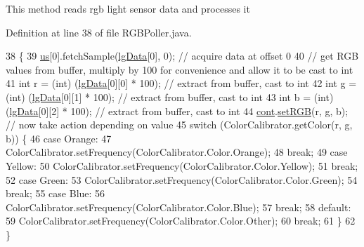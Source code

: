 This method reads rgb light sensor data and processes it 

Definition at line 38 of file R\+G\+B\+Poller.\+java.


\begin{DoxyCode}
38                              \{
39     \hyperlink{classca_1_1mcgill_1_1ecse211_1_1threads_1_1_light_poller_ab6a9cb770bbf71f586697633db1475ff}{us}[0].fetchSample(\hyperlink{classca_1_1mcgill_1_1ecse211_1_1threads_1_1_light_poller_a6cf53aecc3efc481f71d36341d2276c6}{lgData}[0], 0); \textcolor{comment}{// acquire data at offset 0}
40     \textcolor{comment}{// get RGB values from buffer, multiply by 100 for convenience and allow it to be cast to int}
41     \textcolor{keywordtype}{int} r = (int) (\hyperlink{classca_1_1mcgill_1_1ecse211_1_1threads_1_1_light_poller_a6cf53aecc3efc481f71d36341d2276c6}{lgData}[0][0] * 100); \textcolor{comment}{// extract from buffer, cast to int}
42     \textcolor{keywordtype}{int} g = (int) (\hyperlink{classca_1_1mcgill_1_1ecse211_1_1threads_1_1_light_poller_a6cf53aecc3efc481f71d36341d2276c6}{lgData}[0][1] * 100); \textcolor{comment}{// extract from buffer, cast to int}
43     \textcolor{keywordtype}{int} b = (int) (\hyperlink{classca_1_1mcgill_1_1ecse211_1_1threads_1_1_light_poller_a6cf53aecc3efc481f71d36341d2276c6}{lgData}[0][2] * 100); \textcolor{comment}{// extract from buffer, cast to int}
44     \hyperlink{classca_1_1mcgill_1_1ecse211_1_1threads_1_1_light_poller_ab6a9050ced4f6940add4735c8872194a}{cont}.\hyperlink{classca_1_1mcgill_1_1ecse211_1_1threads_1_1_sensor_data_a6ad23111ecd378099f0b4ed0b6d398bc}{setRGB}(r, g, b); \textcolor{comment}{// now take action depending on value}
45     \textcolor{keywordflow}{switch} (ColorCalibrator.getColor(r, g, b)) \{
46       \textcolor{keywordflow}{case} Orange:
47         ColorCalibrator.setFrequency(ColorCalibrator.Color.Orange);
48         \textcolor{keywordflow}{break};
49       \textcolor{keywordflow}{case} Yellow:
50         ColorCalibrator.setFrequency(ColorCalibrator.Color.Yellow);
51         \textcolor{keywordflow}{break};
52       \textcolor{keywordflow}{case} Green:
53         ColorCalibrator.setFrequency(ColorCalibrator.Color.Green);
54         \textcolor{keywordflow}{break};
55       \textcolor{keywordflow}{case} Blue:
56         ColorCalibrator.setFrequency(ColorCalibrator.Color.Blue);
57         \textcolor{keywordflow}{break};
58       \textcolor{keywordflow}{default}:
59         ColorCalibrator.setFrequency(ColorCalibrator.Color.Other);
60         \textcolor{keywordflow}{break};
61     \}
62   \}
\end{DoxyCode}
